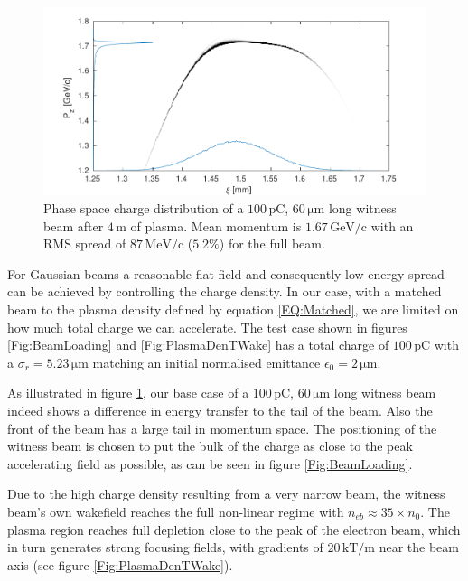 \documentclass[aps,prstab,reprint,amsmath,amssymb,groupedaddress]{revtex4-1}
\newcommand{\unit}[1]{\,\mathrm{#1}}
\begin{document}
\begin{figure}[hbt]
    \includegraphics[width=\linewidth,trim={2mm 0mm 2mm 0mm},clip]{figures/beamPhaseSpace}
    \caption{\label{Fig:BeamPS} Phase space charge distribution of a $100\unit{pC}$, $60\unit{\mu m}$ long witness beam
        after $4\unit{m}$ of plasma. Mean momentum is $1.67\unit{GeV/c}$ with an RMS spread of $87\unit{MeV/c}$
        ($5.2\%$) for the full beam.}
\end{figure}

For Gaussian beams a reasonable flat field and consequently low energy spread can be achieved by controlling the charge
density. In our case, with a matched beam to the plasma density defined by equation \ref{EQ:Matched}, we are limited on
how much total charge we can accelerate. The test case shown in figures \ref{Fig:BeamLoading} and
\ref{Fig:PlasmaDenTWake} has a total charge of $100\unit{pC}$ with a $\sigma_{r}=5.23\unit{\mu m}$ matching an initial
normalised emittance $\epsilon_{0} = 2\unit{\mu m}$.

As illustrated in figure \ref{Fig:BeamPS}, our base case of a $100\unit{pC}$, $60\unit{\mu m}$ long witness beam indeed
shows a difference in energy transfer to the tail of the beam. Also the front of the beam has a large tail in momentum
space. The positioning of the witness beam is chosen to put the bulk of the charge as close to the peak accelerating
field as possible, as can be seen in figure \ref{Fig:BeamLoading}.

Due to the high charge density resulting from a very narrow beam, the witness beam's own wakefield reaches the full
non-linear regime with $n_{eb} \approx 35\times n_{0}$. The plasma region reaches full depletion close to the peak of
the electron beam, which in turn generates strong focusing fields, with gradients of $20\unit{kT/m}$ near the beam axis
(see figure \ref{Fig:PlasmaDenTWake}).
\end{document}
